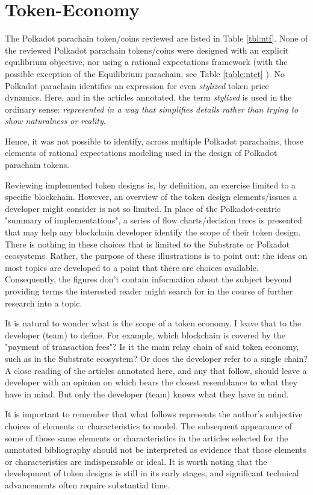 \documentclass[11pt]{article}
\begin{document}
\section{Token-Economy}

The Polkadot parachain token/coins reviewed are listed in Table \ref{tbl:ntf}.  None of the reviewed Polkadot parachain tokens/coins were designed with an explicit equilibrium objective, nor using a rational expectations framework (with the possible exception of the Equilibrium parachain, see Table \ref{table:ntet} ). No Polkadot parachain identifies an expression for even \textit{stylized} token price dynamics.  Here, and in the articles annotated, the term \textit{stylized} is used in the ordinary sense: \textit{represented in a way that simplifies details rather than trying to show naturalness or reality}\autocite{ced23stylized}.

Hence, it was not possible to identify, across multiple Polkadot parachains, those elements of rational expectations modeling used in the design of Polkadot parachain tokens. 

Reviewing implemented token designs is, by definition, an exercise limited to a specific blockchain.  However, an overview of the token design elements/issues a developer might consider is not so limited. In place of the Polkadot-centric "summary of implementations", a series of flow charts/decision trees is presented that may help any blockchain developer identify the scope of their token design. There is nothing in these choices that is limited to the Substrate or Polkadot ecosystems.  Rather, the purpose of these illustrations is to point out: the ideas on most topics are developed to a point that there are choices available. Consequently, the figures don't contain information about the subject beyond providing terms the interested reader might search for in the course of further research into a topic.

It is natural to wonder what is the scope of a token economy. I leave that to the developer (team) to define. For example, which blockchain is covered by the "payment of transaction fees"? Is it the main relay chain of said token economy, such as in the Substrate ecosystem? Or does the developer refer to a single chain?  A close reading of the articles annotated here, and any that follow, should leave a developer with an opinion on which bears the closest resemblance to what they have in mind. But only the developer (team) knows what they have in mind.

It is important to remember that what follows represents the author's subjective choices of elements or characteristics to model. The subsequent appearance of some of those same elements or characteristics in the articles selected for the annotated bibliography should not be interpreted as evidence that those elements or characteristics are indispensable or ideal. It is worth noting that the development of token designs is still in its early stages, and significant technical advancements often require substantial time.
\end{document}
